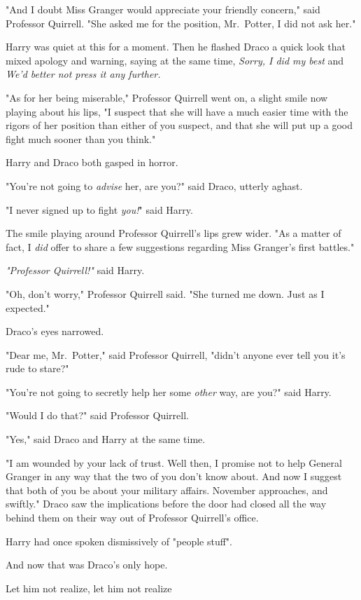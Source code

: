 "And I doubt Miss Granger would appreciate your friendly concern," said
Professor Quirrell. "She asked me for the position, Mr.~Potter, I did not ask
her."

Harry was quiet at this for a moment. Then he flashed Draco a quick look that
mixed apology and warning, saying at the same time, \emph{Sorry, I did my best}
and \emph{We'd better not press it any further.}

"As for her being miserable," Professor Quirrell went on, a slight smile now
playing about his lips, "I suspect that she will have a much easier time with
the rigors of her position than either of you suspect, and that she will put up
a good fight much sooner than you think."

Harry and Draco both gasped in horror.

"You're not going to \emph{advise} her, are you?" said Draco, utterly aghast.

"I never signed up to fight \emph{you!}" said Harry.

The smile playing around Professor Quirrell's lips grew wider. "As a matter of
fact, I \emph{did} offer to share a few suggestions regarding Miss Granger's
first battles."

\emph{"Professor Quirrell!"} said Harry.

"Oh, don't worry," Professor Quirrell said. "She turned me down. Just as I
expected."

Draco's eyes narrowed.

"Dear me, Mr.~Potter," said Professor Quirrell, "didn't anyone ever tell you
it's rude to stare?"

"You're not going to secretly help her some \emph{other} way, are you?" said
Harry.

"Would I do that?" said Professor Quirrell.

"Yes," said Draco and Harry at the same time.

"I am wounded by your lack of trust. Well then, I promise not to help General
Granger in any way that the two of you don't know about. And now I suggest that
both of you be about your military affairs. November approaches, and swiftly."
\sbreak
Draco saw the implications before the door had closed all the way behind them
on their way out of Professor Quirrell's office.

Harry had once spoken dismissively of "people stuff".

And now that was Draco's only hope.

Let him not realize, let him not realize{\el}

